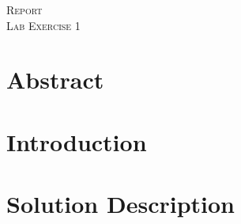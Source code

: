 \documentclass[11pt]{article}
\begin{document}
\begin{titlepage}
	\large
	\begin{center}

\textsc{\Large Report \\Lab Exercise 1}\\[0.5cm]

	\end{center}

\end{titlepage}



\newpage


\section*{Abstract}
\label{Abstract}


 
\newpage





\clearpage




\section{Introduction}
	\label{s:Introduction}


   
\clearpage

\section{Solution Description}
	\label{s:solution}
	
	
	
\clearpage


\end{document}
